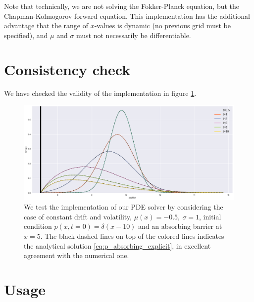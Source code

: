 \documentclass[11pt]{article}
\begin{document}
Note that technically, we are not solving the Fokker-Planck equation, but the Chapman-Kolmogorov forward equation. 
This implementation has the additional advantage that the range of $x$-values is dynamic (no previous grid must be specified), 
and $\mu$ and $\sigma$ must not necessarily be differentiable. 


\section{Consistency check} 

We have checked the validity of the implementation in figure \ref{fig:PDE_solution}. 
\begin{figure}[!htb]
	\centering
	\includegraphics[width=\textwidth]{PDE_solution.png}
	\caption{We test the implementation of our PDE solver by considering the case of constant drift and volatility, $\mu(x) =  -0.5, ~\sigma = 1$, 
			initial condition $p(x, t=0) = \delta(x-10)$ and an absorbing barrier at $x=5$. 
			The black dashed lines on top of the colored lines indicates the analytical solution \eqref{eq:p_absorbing_explicit},
			in excellent agreement with the numerical one.}
	\label{fig:PDE_solution}
\end{figure}



\clearpage

\clearpage



\section{Usage} 
\end{document}
